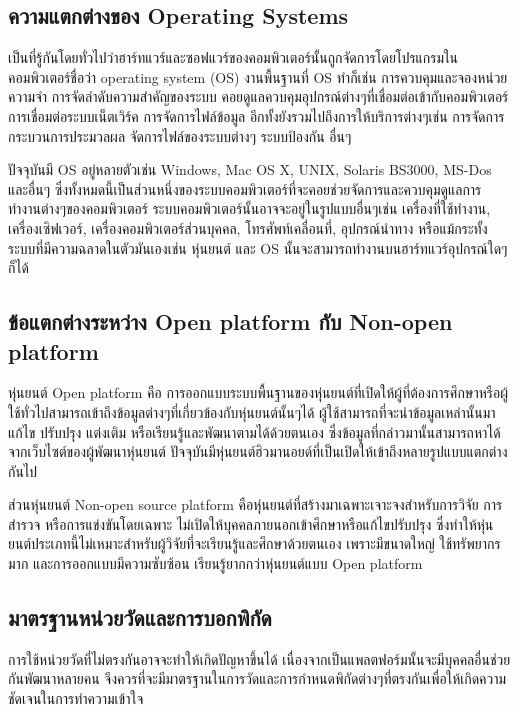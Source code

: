 \subsection{ความแตกต่างของ Operating Systems}

เป็นที่รู้กันโดยทั่วไปว่าฮาร์ทแวร์และซอฟแวร์ของคอมพิวเตอร์นั้นถูกจัดการโดยโปรแกรมในคอมพิวเตอร์ชื่อว่า
operating system (OS) งานพื้นฐานที่ OS ทำก็เช่น การควบคุมและจองหน่วยความจำ
การจัดลำดับความสำคัญของระบบ คอยดูแลควบคุมอุปกรณ์ต่างๆที่เชื่อมต่อเข้ากับคอมพิวเตอร์
การเชื่อมต่อระบบเน็ตเวิร์ค การจัดการไฟล์ข้อมูล อีกทั้งยังรวมไปถึงการให้บริการต่างๆเช่น
การจัดการกระบวนการประมวลผล จัดการไฟล์ของระบบต่างๆ ระบบป้องกัน อื่นๆ

ปัจจุบันมี OS อยู่หลายตัวเช่น Windows, Mac OS X, UNIX, Solaris BS3000, MS-Dos และอื่นๆ
ซึ่งทั้งหมดนี้เป็นส่วนหนึ่งของระบบคอมพิวเตอร์ที่จะคอยช่วยจัดการและควบคุมดูแลการทำงานต่างๆของคอมพิวเตอร์
ระบบคอมพิวเตอร์นั้นอาจจะอยู่ในรูปแบบอื่นๆเช่น เครื่องที่ใช้ทำงาน, เครื่องเซิฟเวอร์, เครื่องคอมพิวเตอร์ส่วนบุคคล, โทรศัพท์เคลื่อนที่,
อุปกรณ์นำทาง หรือแม้กระทั้งระบบที่มีความฉลาดในตัวมันเองเช่น หุ่นยนต์ และ OS
นั้นจะสามารถทำงานบนฮาร์ทแวร์อุปกรณ์ใดๆก็ได้

\subsection{ข้อแตกต่างระหว่าง Open platform กับ Non-open platform}
หุ่นยนต์ Open platform คือ การออกแบบระบบพื้นฐานของหุ่นยนต์ที่เปิดให้ผู้ที่ต้องการศึกษาหรือผู้ใช้ทั่วไปสามารถเข้าถึงข้อมูลต่างๆที่เกี่ยวข้องกับหุ่นยนต์นั้นๆได้
ผู้ใช้สามารถที่จะนำข้อมูลเหล่านั้นมาแก้ไข ปรับปรุง แต่งเติม หรือเรียนรู้และพัฒนาตามได้ด้วยตนเอง 
ซึ่งข้อมูลที่กล่าวมานั้นสามารถหาได้จากเว็บไซต์ของผู้พัฒนาหุ่นยนต์ ปัจจุบันมีหุ่นยนต์ฮิวมานอยด์ที่เป็นเปิดให้เข้าถึงหลายรูปแบบแตกต่างกันไป

ส่วนหุ่นยนต์ Non-open source platform คือหุ่นยนต์ที่สร้างมาเฉพาะเจาะจงสำหรับการวิจัย การสำรวจ หรือการแข่งขันโดยเฉพาะ
ไม่เปิดให้บุคคลภายนอกเข้าศึกษาหรือแก้ไขปรับปรุง ซึ่งทำให้หุ่นยนต์ประเภทนี้ไม่เหมาะสำหรับผู้วิจัยที่จะเรียนรู้และศึกษาด้วยตนเอง เพราะมีขนาดใหญ่
ใช้ทรัพยากรมาก และการออกแบบมีความซับซ้อน เรียนรู้ยากกว่าหุ่นยนต์แบบ Open platform

\subsection{มาตรฐานหน่วยวัดและการบอกพิกัด}
การใช้หน่วยวัดที่ไม่ตรงกันอาจจะทำให้เกิดปัญหาขึ้นได้ เนื่องจากเป็นแพลตฟอร์มนั้นจะมีบุคคลอื่นช่วยกันพัฒนาหลายคน
จึงควรที่จะมีมาตรฐานในการวัดและการกำหนดพิกัดต่างๆที่ตรงกันเพื่อให้เกิดความชัดเจนในการทำความเข้าใจ

